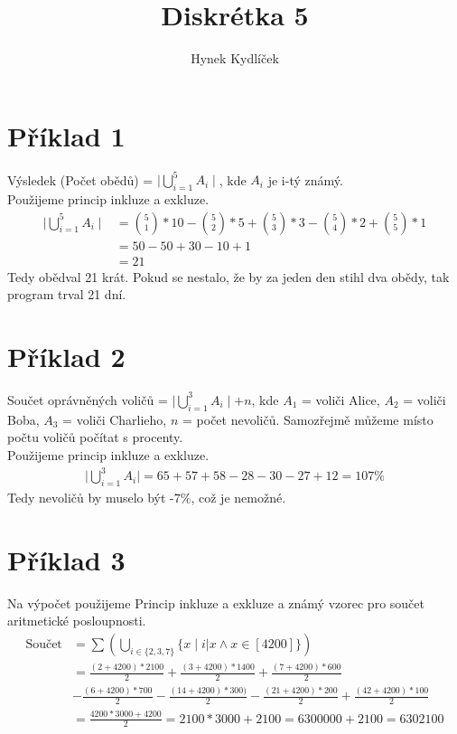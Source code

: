 \documentclass[a4paper]{article}
\author{Hynek Kydlíček}
\title{Diskrétka 5}
\begin{document}
\maketitle
\section{Příklad 1}
Výsledek (Počet obědů) = $\mid\bigcup_{i=1}^5 A_i\mid$, kde $A_i$ je i-tý známý.
\\
Použijeme princip inkluze a exkluze.
\begin{align*}
    \mid\bigcup_{i=1}^5 A_i\mid &= {5\choose1}*10 - {5\choose2}*5 + {5\choose3}*3 - {5\choose4}*2 + {5\choose5}*1\\
    &= 50 - 50 + 30 - 10 + 1\\
    &= 21
\end{align*}
Tedy obědval 21 krát. Pokud se nestalo, že by za jeden den stihl dva obědy, tak program trval 21 dní.

\section{Příklad 2}
Součet oprávněných voličů = $\mid\bigcup_{i=1}^3 A_i\mid + n$, kde $A_1$ = voliči Alice, $A_2$ = voliči Boba,
$A_3$ = voliči Charlieho, $n$ = počet nevoličů. Samozřejmě můžeme místo počtu voličů počítat s procenty.
\\
Použijeme princip inkluze a exkluze.
\begin{align*}
    \mid\bigcup_{i=1}^3 A_i\mid = 65 + 57 + 58 - 28 - 30 - 27 + 12 = 107\%
\end{align*}
Tedy nevoličů by muselo být -7\%, což je nemožné.

\section{Příklad 3}
Na výpočet použijeme Princip inkluze a exkluze a známý vzorec pro součet aritmetické posloupnosti.
\begin{align*}
    \text{Součet} &= \sum (\bigcup_{i\in \{2,3,7\}} \{x \mid i|x \wedge x \in [4200]\})\\
                  &= \frac{(2+4200) * 2100}{2} + \frac{(3+4200) * 1400}{2} + \frac{(7+4200)*600}{2} \\
                  &- \frac{(6+4200)*700}{2} - \frac{(14+4200)*300)}{2} - \frac{(21+4200)*200}{2} + \frac{(42+4200)*100}{2}\\
                  &= \frac{4200*3000+4200}{2} = 2100*3000 + 2100 = 6300000 + 2100 = 6302100
\end{align*}
\end{document}
